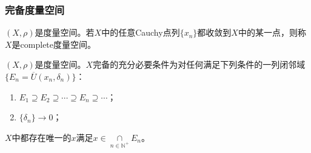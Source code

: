 \subsubsection{完备度量空间}
\begin{definition}
	$(X,\rho)$是度量空间。若$X$中的任意Cauchy点列$\{x_n\}$都收敛到$X$中的某一点，则称$X$是\gls{complete}度量空间。
\end{definition}
\begin{theorem}[闭球套定理]\label{theo:NestedClosedBallsTheorem}
	$(X,\rho)$是度量空间。$X$完备的充分必要条件为对任何满足下列条件的一列闭邻域$\{E_n=\overline{U}(x_n,\delta_n)\}$：
	\begin{enumerate}
		\item $E_1\supseteq E_2\supseteq\cdots\supseteq E_n\supseteq\cdots$；
		\item $\{\delta_n\}\to0$；
	\end{enumerate}
	$X$中都存在唯一的$x$满足$x\in\underset{n\in\mathbb{N}^+}{\cap}E_n$。
\end{theorem}
